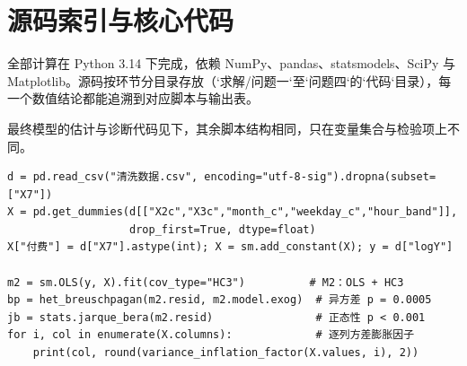 \appendix
\section{源码索引与核心代码}

全部计算在 Python 3.14 下完成，依赖 NumPy、pandas、statsmodels、SciPy 与 Matplotlib。源码按环节分目录存放（`求解/问题一`至`问题四`的`代码`目录），每一个数值结论都能追溯到对应脚本与输出表。

最终模型的估计与诊断代码见下，其余脚本结构相同，只在变量集合与检验项上不同。

\begin{verbatim}
d = pd.read_csv("清洗数据.csv", encoding="utf-8-sig").dropna(subset=["X7"])
X = pd.get_dummies(d[["X2c","X3c","month_c","weekday_c","hour_band"]],
                   drop_first=True, dtype=float)
X["付费"] = d["X7"].astype(int); X = sm.add_constant(X); y = d["logY"]

m2 = sm.OLS(y, X).fit(cov_type="HC3")          # M2：OLS + HC3
bp = het_breuschpagan(m2.resid, m2.model.exog)  # 异方差 p = 0.0005
jb = stats.jarque_bera(m2.resid)                # 正态性 p < 0.001
for i, col in enumerate(X.columns):             # 逐列方差膨胀因子
    print(col, round(variance_inflation_factor(X.values, i), 2))
\end{verbatim}
